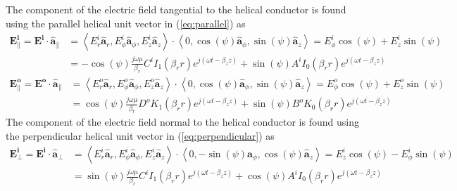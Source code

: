 The component of the electric field tangential to the helical conductor is found using the parallel helical unit vector in (\ref{eq:parallel}) as 
\begin{equation}\label{eq:Ei_tan}
	\begin{split}
		\mathbf{E_{\parallel}^i} = \mathbf{E^i} \cdot \hat{\mathbf{a}}_{\parallel} &= \left\langle E_r^i\hat{\mathbf{a}}_{r}, E_{\phi}^i\hat{\mathbf{a}}_{\phi}, E_z^i\hat{\mathbf{a}}_{z} \right\rangle \cdot \left\langle 0, \cos(\psi)\hat{\mathbf{a}}_{\phi}, \sin(\psi)\hat{\mathbf{a}}_{z} \right\rangle = E_{\phi}^i\cos(\psi) + E_{z}^i\sin(\psi) \\
		&= -\cos(\psi) \frac{j \omega \mu}{\beta_r} C^i I_1(\beta_r r) e^{j(\omega t - \beta_z z)}  + \sin(\psi)A^{i}I_{0}(\beta_{r}r)e^{j(\omega t - \beta_{z}z)}
	\end{split}
\end{equation}
\begin{equation}\label{eq:Eo_tan}
	\begin{split}
		\mathbf{E_{\parallel}^o} = \mathbf{E^o} \cdot \hat{\mathbf{a}}_{\parallel} &= \left\langle E_r^o\hat{\mathbf{a}}_{r}, E_{\phi}^o\hat{\mathbf{a}}_{\phi}, E_z^o\hat{\mathbf{a}}_{z} \right\rangle \cdot \left\langle 0, \cos(\psi)\hat{\mathbf{a}}_{\phi}, \sin(\psi)\hat{\mathbf{a}}_{z} \right\rangle = E_{\phi}^o\cos(\psi) + E_{z}^o\sin(\psi) \\
		&= \cos(\psi) \frac{j \omega \mu}{\beta_r} D^o K_1(\beta_r r) e^{j(\omega t - \beta_z z)}  + \sin(\psi)B^{o}K_{0}(\beta_{r}r)e^{j(\omega t - \beta_{z}z)}
	\end{split}
\end{equation}
The component of the electric field normal to the helical conductor is found using the perpendicular helical unit vector in (\ref{eq:perpendicular}) as
\begin{equation}\label{eq:Ei_norm}
	\begin{split}
		\mathbf{E_{\perp}^i} = \mathbf{E^i} \cdot \hat{\mathbf{a}}_{\perp} &= \left\langle E_r^i\hat{\mathbf{a}}_{r}, E_{\phi}^i\hat{\mathbf{a}}_{\phi}, E_z^i\hat{\mathbf{a}}_{z} \right\rangle \cdot \left\langle 0, -\sin(\psi)\hat{\mathbf{a}}_{\phi}, \cos(\psi)\hat{\mathbf{a}}_{z} \right\rangle = E_{z}^i\cos(\psi) - E_{\phi}^i\sin(\psi) \\
		&= \sin(\psi) \frac{j \omega \mu}{\beta_r} C^i I_1(\beta_r r) e^{j(\omega t - \beta_z z)}  + \cos(\psi)A^{i}I_{0}(\beta_{r}r)e^{j(\omega t - \beta_{z}z)}
	\end{split}
\end{equation} 
